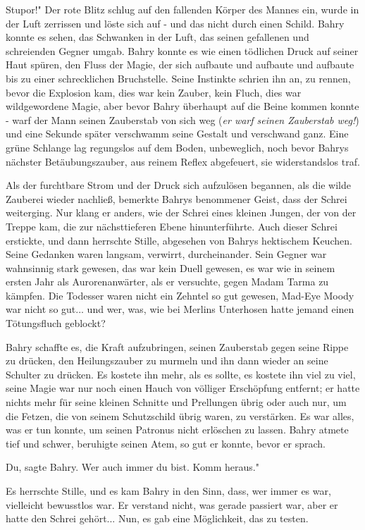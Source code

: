 \glqq Stupor!" Der rote Blitz schlug auf den fallenden Körper des Mannes ein,
wurde in der Luft zerrissen und löste sich auf - und das nicht durch einen
Schild. Bahry konnte es sehen, das Schwanken in der Luft, das seinen gefallenen
und schreienden Gegner umgab. Bahry konnte es wie einen tödlichen Druck auf
seiner Haut spüren, den Fluss der Magie, der sich aufbaute und aufbaute und
aufbaute bis zu einer schrecklichen Bruchstelle. Seine Instinkte schrien ihn an,
zu rennen, bevor die Explosion kam, dies war kein Zauber, kein Fluch, dies war
wildgewordene Magie, aber bevor Bahry überhaupt auf die Beine kommen konnte -
warf der Mann seinen Zauberstab von sich weg (\emph{er warf seinen Zauberstab
weg!}) und eine Sekunde später verschwamm seine Gestalt und verschwand ganz.
Eine grüne Schlange lag regungslos auf dem Boden, unbeweglich, noch bevor Bahrys
nächster Betäubungszauber, aus reinem Reflex abgefeuert, sie widerstandslos
traf.

Als der furchtbare Strom und der Druck sich aufzulösen begannen, als die wilde
Zauberei wieder nachließ, bemerkte Bahrys benommener Geist, dass der Schrei
weiterging. Nur klang er anders, wie der Schrei eines kleinen Jungen, der von
der Treppe kam, die zur nächsttieferen Ebene hinunterführte. Auch dieser Schrei
erstickte, und dann herrschte Stille, abgesehen von Bahrys hektischem Keuchen.
Seine Gedanken waren langsam, verwirrt, durcheinander. Sein Gegner war
wahnsinnig stark gewesen, das war kein Duell gewesen, es war wie in seinem
ersten Jahr als Aurorenanwärter, als er versuchte, gegen Madam Tarma zu kämpfen.
Die Todesser waren nicht ein Zehntel so gut gewesen, Mad-Eye Moody war nicht so
gut... und wer, was, wie bei Merlins Unterhosen hatte jemand einen Tötungsfluch
geblockt?

Bahry schaffte es, die Kraft aufzubringen, seinen Zauberstab gegen seine Rippe
zu drücken, den Heilungszauber zu murmeln und ihn dann wieder an seine Schulter
zu drücken. Es kostete ihn mehr, als es sollte, es kostete ihn viel zu viel,
seine Magie war nur noch einen Hauch von völliger Erschöpfung entfernt; er hatte
nichts mehr für seine kleinen Schnitte und Prellungen übrig oder auch nur, um
die Fetzen, die von seinem Schutzschild übrig waren, zu verstärken. Es war
alles, was er tun konnte, um seinen Patronus nicht erlöschen zu lassen. Bahry
atmete tief und schwer, beruhigte seinen Atem, so gut er konnte, bevor er
sprach.

\glqq Du\grqq{}, sagte Bahry. \glqq Wer auch immer du bist. Komm heraus."

Es herrschte Stille, und es kam Bahry in den Sinn, dass, wer immer es war,
vielleicht bewusstlos war. Er verstand nicht, was gerade passiert war, aber er
hatte den Schrei gehört... Nun, es gab eine Möglichkeit, das zu testen.

